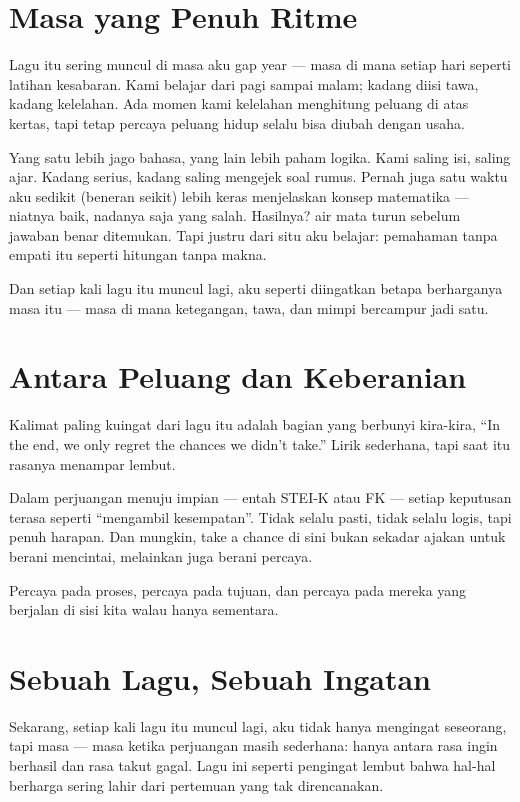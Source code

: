 \documentclass[
  letterpaper,
  DIV=11,
  numbers=noendperiod]{scrreprt}
\begin{document}
\section{Masa yang Penuh Ritme}\label{masa-yang-penuh-ritme}

Lagu itu sering muncul di masa aku gap year --- masa di mana setiap hari
seperti latihan kesabaran. Kami belajar dari pagi sampai malam; kadang
diisi tawa, kadang kelelahan. Ada momen kami kelelahan menghitung
peluang di atas kertas, tapi tetap percaya peluang hidup selalu bisa
diubah dengan usaha.

Yang satu lebih jago bahasa, yang lain lebih paham logika. Kami saling
isi, saling ajar. Kadang serius, kadang saling mengejek soal rumus.
Pernah juga satu waktu aku sedikit (beneran seikit) lebih keras
menjelaskan konsep matematika --- niatnya baik, nadanya saja yang salah.
Hasilnya? air mata turun sebelum jawaban benar ditemukan. Tapi justru
dari situ aku belajar: pemahaman tanpa empati itu seperti hitungan tanpa
makna.

Dan setiap kali lagu itu muncul lagi, aku seperti diingatkan betapa
berharganya masa itu --- masa di mana ketegangan, tawa, dan mimpi
bercampur jadi satu.

\section{Antara Peluang dan
Keberanian}\label{antara-peluang-dan-keberanian}

Kalimat paling kuingat dari lagu itu adalah bagian yang berbunyi
kira-kira, ``In the end, we only regret the chances we didn't take.''
Lirik sederhana, tapi saat itu rasanya menampar lembut.

Dalam perjuangan menuju impian --- entah STEI-K atau FK --- setiap
keputusan terasa seperti ``mengambil kesempatan''. Tidak selalu pasti,
tidak selalu logis, tapi penuh harapan. Dan mungkin, take a chance di
sini bukan sekadar ajakan untuk berani mencintai, melainkan juga berani
percaya.

Percaya pada proses, percaya pada tujuan, dan percaya pada mereka yang
berjalan di sisi kita walau hanya sementara.

\section{Sebuah Lagu, Sebuah Ingatan}\label{sebuah-lagu-sebuah-ingatan}

Sekarang, setiap kali lagu itu muncul lagi, aku tidak hanya mengingat
seseorang, tapi masa --- masa ketika perjuangan masih sederhana: hanya
antara rasa ingin berhasil dan rasa takut gagal. Lagu ini seperti
pengingat lembut bahwa hal-hal berharga sering lahir dari pertemuan yang
tak direncanakan.
\end{document}
